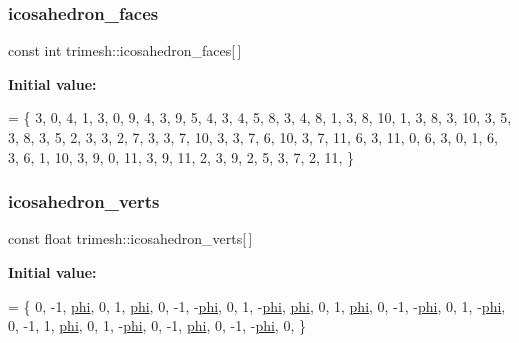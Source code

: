 \mbox{\label{namespacetrimesh_a0f03d62179d3f32963dc31080cdad7a7}} 
\subsubsection{\texorpdfstring{icosahedron\+\_\+faces}{icosahedron\_faces}}
{\footnotesize\ttfamily const int trimesh\+::icosahedron\+\_\+faces\mbox{[}$\,$\mbox{]}\hspace{0.3cm}{\ttfamily [static]}}

{\bfseries Initial value\+:}
\begin{DoxyCode}
= \{
    3, 0, 4, 1,
    3, 0, 9, 4,
    3, 9, 5, 4,
    3, 4, 5, 8,
    3, 4, 8, 1,
    3, 8, 10, 1,
    3, 8, 3, 10,
    3, 5, 3, 8,
    3, 5, 2, 3,
    3, 2, 7, 3,
    3, 7, 10, 3,
    3, 7, 6, 10,
    3, 7, 11, 6,
    3, 11, 0, 6,
    3, 0, 1, 6,
    3, 6, 1, 10,
    3, 9, 0, 11,
    3, 9, 11, 2,
    3, 9, 2, 5,
    3, 7, 2, 11,
\}
\end{DoxyCode}
\mbox{\label{namespacetrimesh_ab0b640c1a4bf129f87cd75ad0c91b1c0}} 
\subsubsection{\texorpdfstring{icosahedron\+\_\+verts}{icosahedron\_verts}}
{\footnotesize\ttfamily const float trimesh\+::icosahedron\+\_\+verts\mbox{[}$\,$\mbox{]}\hspace{0.3cm}{\ttfamily [static]}}

{\bfseries Initial value\+:}
\begin{DoxyCode}
= \{
    0, -1,  \hyperlink{namespacetrimesh_ade4acd999d6155e3cf3d58ce8b0a30d8}{phi},
    0,  1,  \hyperlink{namespacetrimesh_ade4acd999d6155e3cf3d58ce8b0a30d8}{phi},
    0, -1, -\hyperlink{namespacetrimesh_ade4acd999d6155e3cf3d58ce8b0a30d8}{phi},
    0,  1, -\hyperlink{namespacetrimesh_ade4acd999d6155e3cf3d58ce8b0a30d8}{phi},
     \hyperlink{namespacetrimesh_ade4acd999d6155e3cf3d58ce8b0a30d8}{phi}, 0,  1,
     \hyperlink{namespacetrimesh_ade4acd999d6155e3cf3d58ce8b0a30d8}{phi}, 0, -1,
    -\hyperlink{namespacetrimesh_ade4acd999d6155e3cf3d58ce8b0a30d8}{phi}, 0,  1,
    -\hyperlink{namespacetrimesh_ade4acd999d6155e3cf3d58ce8b0a30d8}{phi}, 0, -1,
     1,  \hyperlink{namespacetrimesh_ade4acd999d6155e3cf3d58ce8b0a30d8}{phi}, 0,
     1, -\hyperlink{namespacetrimesh_ade4acd999d6155e3cf3d58ce8b0a30d8}{phi}, 0,
    -1,  \hyperlink{namespacetrimesh_ade4acd999d6155e3cf3d58ce8b0a30d8}{phi}, 0,
    -1, -\hyperlink{namespacetrimesh_ade4acd999d6155e3cf3d58ce8b0a30d8}{phi}, 0,
\}
\end{DoxyCode}
\mbox{\label{namespacetrimesh_a7bb716308df847698b8d3bfafe2c7539}} 
